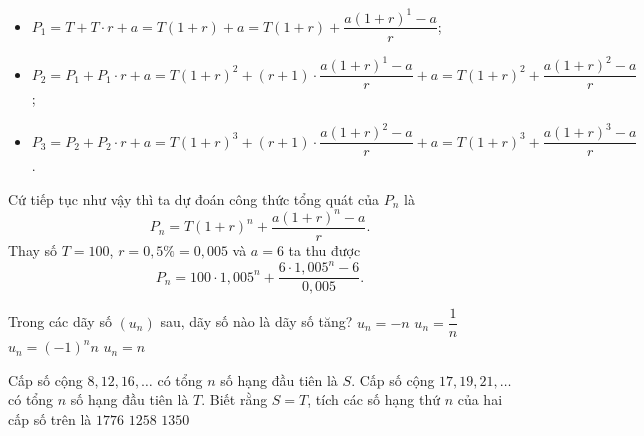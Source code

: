 \begin{ex}
{\begin{enumerate}
\begin{itemize}
                \item $P_1 = T + T\cdot r + a = T(1+r) + a = T(1+r) + \dfrac{a(1+r)^1 - a}{r}$;
                \item $P_2 = P_1 + P_1\cdot r + a = T(1+r)^2 + (r+1)\cdot\dfrac{a(1+r)^1 - a}{r} + a = T(1+r)^2 + \dfrac{a(1+r)^2 - a}{r}$;
                \item $P_3 = P_2 + P_2\cdot r + a = T(1+r)^3 + (r+1)\cdot\dfrac{a(1+r)^2 - a}{r} + a = T(1+r)^3 + \dfrac{a(1+r)^3 - a}{r}$.
            \end{itemize}
            Cứ tiếp tục như vậy thì ta dự đoán công thức tổng quát của $P_n$ là 
            \[
            P_n = T(1+r)^n + \dfrac{a(1+r)^n - a}{r}.
            \]
            Thay số $T = 100$, $r = 0{,}5\% = 0{,}005$ và $a =6$ ta thu được
            \[
            P_n = 100\cdot 1{,}005^n + \dfrac{6\cdot 1{,}005^n - 6}{0{,}005}.
            \]
        \end{enumerate}
    }
\end{ex}

\begin{ex} 
    Trong các dãy số $\left(u_n\right)$ sau, dãy số nào là dãy số tăng?
    \choice
    {$u_n=-n$}
    {$u_n=\dfrac{1}{n}$}
    {$u_n=(-1)^n n$}
    {\True $u_n=n$}
\end{ex}

\begin{ex}
    Cấp số cộng $8, 12,16,\ldots$ có tổng $n$ số hạng đầu tiên là $S$. Cấp số cộng $17, 19, 21,\ldots$ có tổng $n$ số hạng đầu tiên là $T$. Biết rằng $S = T$, tích các số hạng thứ $n$ của hai cấp số trên là
    {$1776$}
    {$1258$}
    {$1350$}
\end{ex}

